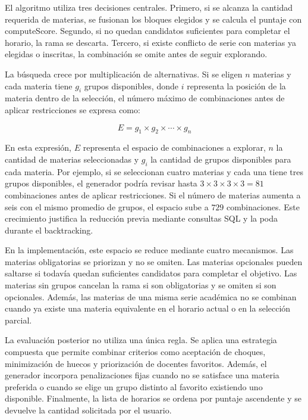 El algoritmo utiliza tres decisiones centrales. Primero, si se alcanza la cantidad requerida de materias, se fusionan los bloques elegidos y se calcula el puntaje con computeScore. Segundo, si no quedan candidatos suficientes para completar el horario, la rama se descarta. Tercero, si existe conflicto de serie con materias ya elegidas o inscritas, la combinación se omite antes de seguir explorando.

La búsqueda crece por multiplicación de alternativas. Si se eligen \(n\) materias y cada materia tiene \(g_i\) grupos disponibles, donde \(i\) representa la posición de la materia dentro de la selección, el número máximo de combinaciones antes de aplicar restricciones se expresa como:

\begin{equation}
  E = g_1 \times g_2 \times \cdots \times g_n
\end{equation}

En esta expresión, \(E\) representa el espacio de combinaciones a explorar, \(n\) la cantidad de materias seleccionadas y \(g_i\) la cantidad de grupos disponibles para cada materia. Por ejemplo, si se seleccionan cuatro materias y cada una tiene tres grupos disponibles, el generador podría revisar hasta \(3 \times 3 \times 3 \times 3 = 81\) combinaciones antes de aplicar restricciones. Si el número de materias aumenta a seis con el mismo promedio de grupos, el espacio sube a \(729\) combinaciones. Este crecimiento justifica la reducción previa mediante consultas SQL y la poda durante el backtracking.

En la implementación, este espacio se reduce mediante cuatro mecanismos. Las materias obligatorias se priorizan y no se omiten. Las materias opcionales pueden saltarse si todavía quedan suficientes candidatos para completar el objetivo. Las materias sin grupos cancelan la rama si son obligatorias y se omiten si son opcionales. Además, las materias de una misma serie académica no se combinan cuando ya existe una materia equivalente en el horario actual o en la selección parcial.

La evaluación posterior no utiliza una única regla. Se aplica una estrategia compuesta que permite combinar criterios como aceptación de choques, minimización de huecos y priorización de docentes favoritos. Además, el generador incorpora penalizaciones fijas cuando no se satisface una materia preferida o cuando se elige un grupo distinto al favorito existiendo uno disponible. Finalmente, la lista de horarios se ordena por puntaje ascendente y se devuelve la cantidad solicitada por el usuario.

